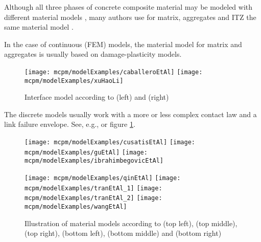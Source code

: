 Although all three phases of concrete composite material may be modeled with different material models
\cite{%
	ZhouHao2008a,%
	ZhouHao2009a%
}, many authors use for matrix, aggregates and ITZ the same material model
\cite{%
	AzevedoLemosAlmeida2008a,%
	GrohKonietzkyWalterHerbst2011a,%
	GuHongWangLin2013a,%
	KimAlrub2011a,%
	MunguleRaghuprasad2011a,%
	PanFengJinXuSunZhangOwen2013a,%
	SatohYamadaIshiyama2013a,%
	WangLinGu2008a,%
	YipLiLiaoBolander2006a,%
	ZhouHao2008b%
}.

In the case of continuous (FEM) models, the material model for matrix and aggregates is usually based on damage-plasticity models.
\begin{figure}[ht]
	\centering
	\texttt{[image: mcpm/modelExamples/caballeroEtAl]}
	\texttt{[image: mcpm/modelExamples/xuHaoLi]}
	\caption[Interface model]{Interface model according to
		\cite{CaballeroWillamCarol2008a} (left)
		and
		\cite{XuHaoLi2012a} (right)
	}
\end{figure}

The discrete models usually work with a more or less complex contact law and a link failure envelope.
See, e.g.,
\cite{%
	CusatisBazantCedolin2006a,%
	GuHongWangLin2013a,%
	IbrahimbegovicDelaplace2003a,%
	QinZhang2011a,%
	TranDonzeMarin2011a,%
	WangLinGu2008a%
} or figure \ref{figMCPMDemModels}.
\begin{figure}[ht]
	\centering
	\newcommand{\hhhh}{\hspace{5mm}}
	\texttt{[image: mcpm/modelExamples/cusatisEtAl]}
	\hhhh
	\texttt{[image: mcpm/modelExamples/guEtAl]}
	\hhhh
	\texttt{[image: mcpm/modelExamples/ibrahimbegovicEtAl]}
	\par
	\vspace{5mm}
	\texttt{[image: mcpm/modelExamples/qinEtAl]}
	\hhhh
	\texttt{[image: mcpm/modelExamples/tranEtAl\_1]}
	\texttt{[image: mcpm/modelExamples/tranEtAl\_2]}
	\hhhh
	\texttt{[image: mcpm/modelExamples/wangEtAl]}
	\caption[Illustration of material models]{Illustration of material models according to
		\cite{CusatisBazantCedolin2006a} (top left),
		\cite{GuHongWangLin2013a} (top middle),
		\cite{IbrahimbegovicDelaplace2003a} (top right),
		\cite{QinZhang2011a} (bottom left),
		\cite{TranDonzeMarin2011a} (bottom middle)
		and
		\cite{WangLinGu2008a} (bottom right)
	}
	\label{figMCPMDemModels}
\end{figure}

